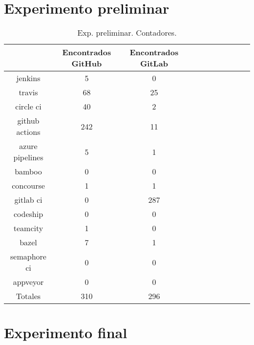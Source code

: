 \section{Experimento preliminar}

\begin{table}
  \centering
  \caption{Exp. preliminar. Contadores.}
  \label{tab:tabla_p1}

\begin{footnotesize}
\renewcommand{\arraystretch}{1.5} %
\begin{tabular}{ccccccccccc}
  \hline
  {} &  Encontrados GitHub &  Encontrados GitLab \\
  \hline
  jenkins         &                   5 &                   0 \\
  travis          &                  68 &                  25 \\
  circle ci       &                  40 &                   2 \\
  github actions  &                 242 &                  11 \\
  azure pipelines &                   5 &                   1 \\
  bamboo          &                   0 &                   0 \\
  concourse       &                   1 &                   1 \\
  gitlab ci       &                   0 &                 287 \\
  codeship        &                   0 &                   0 \\
  teamcity        &                   1 &                   0 \\
  bazel           &                   7 &                   1 \\
  semaphore ci    &                   0 &                   0 \\
  appveyor        &                   0 &                   0 \\
  \hline
  Totales         &                 310 &                 296 \\
 \end{tabular}
\end{footnotesize}

\end{table}

\newpage

\section{Experimento final}

